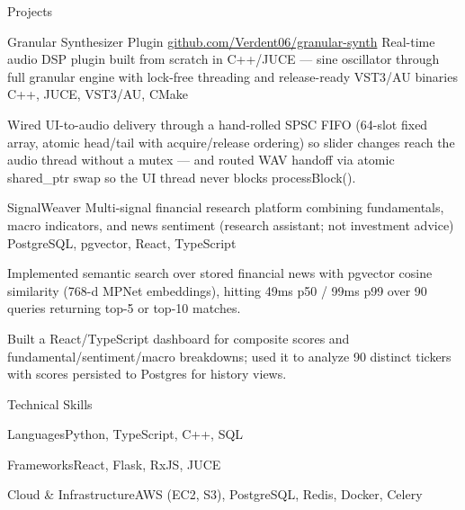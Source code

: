 \documentclass[
	11pt
]{../../../template}
\begin{document}
	\begin{rSection}{P}{rojects}
		\begin{rSectionEntry}
			{Granular Synthesizer Plugin}
			{\href{https://github.com/Verdent06/granular-synth}{github.com/Verdent06/granular-synth}}
			{Real-time audio DSP plugin built from scratch in C++/JUCE — sine oscillator through full granular engine with lock-free threading and release-ready VST3/AU binaries}
			{C++, JUCE, VST3/AU, CMake}
			{}

			\item Wired UI-to-audio delivery through a hand-rolled SPSC FIFO (64-slot fixed array, atomic head/tail with acquire/release ordering) so slider changes reach the audio thread without a mutex — and routed WAV handoff via atomic shared\_ptr swap so the UI thread never blocks processBlock().
		\end{rSectionEntry}

		\begin{rSectionEntry}
			{SignalWeaver}
			{}
			{Multi-signal financial research platform combining fundamentals, macro indicators, and news sentiment (research assistant; not investment advice)}
			{PostgreSQL, pgvector, React, TypeScript}
			{}

			\item Implemented semantic search over stored financial news with pgvector cosine similarity (768-d MPNet embeddings), hitting 49ms p50 / 99ms p99 over 90 queries returning top-5 or top-10 matches.
			\item Built a React/TypeScript dashboard for composite scores and fundamental/sentiment/macro breakdowns; used it to analyze 90 distinct tickers with scores persisted to Postgres for history views.
		\end{rSectionEntry}
	\end{rSection}

	\begin{rSection}{T}{echnical Skills}
		\begin{rSet}{Languages}{Python, TypeScript, C++, SQL}
		\end{rSet}
		\begin{rSet}{Frameworks}{React, Flask, RxJS, JUCE}
		\end{rSet}
		\begin{rSet}{Cloud \& Infrastructure}{AWS (EC2, S3), PostgreSQL, Redis, Docker, Celery}
		\end{rSet}
	\end{rSection}
\end{document}
